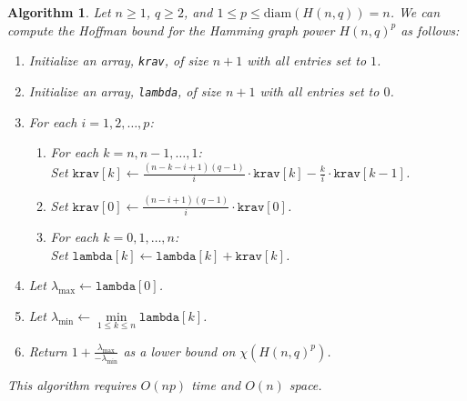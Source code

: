 \documentclass{article}
\numberwithin{equation}{section}
\theoremstyle{plain}
\newtheorem{algo}[theorem]{Algorithm}
\begin{document}
\begin{algo}\label{algo:3.5}
    Let $n \ge 1$, $q \ge 2$, and $1 \le p \le \mathrm{diam}(H(n, q)) = n$. We can compute the Hoffman bound for the Hamming graph power $H(n, q)^p$ as follows:
    {
        \normalfont
        \begin{enumerate}
            \item Initialize an array, \texttt{krav}, of size $n + 1$ with all entries set to $1$.
            \item Initialize an array, \texttt{lambda}, of size $n + 1$ with all entries set to $0$.
            \item For each $i = 1, 2, \ldots, p$:
                \begin{enumerate}
                    \item For each $k = n, n - 1, \ldots, 1$:\\
                        \hspace*{\algorithmicindent}Set $\texttt{krav}[k] \gets \frac{(n - k - i + 1)(q - 1)}{i} \cdot \texttt{krav}[k] - \frac{k}{i} \cdot \texttt{krav}[k - 1]$.
                    \item Set $\texttt{krav}[0] \gets \frac{(n - i + 1)(q - 1)}{i} \cdot \texttt{krav}[0]$.
                    \item For each $k = 0, 1, \ldots, n$:\\
                        \hspace*{\algorithmicindent}Set $\texttt{lambda}[k] \gets \texttt{lambda}[k] + \texttt{krav}[k]$.
                \end{enumerate}
            \item Let $\lambda_{\text{max}} \gets \texttt{lambda}[0]$.
            \item Let $\lambda_{\text{min}} \gets \min\limits_{1 \le k \le n} \texttt{lambda}[k]$.
            \item Return $1 + \frac{\lambda_{\text{max}}}{-\lambda_{\text{min}}}$ as a lower bound on $\chi(H(n, q)^p)$.
        \end{enumerate}
    }
    This algorithm requires $O(np)$ time and $O(n)$ space.
\end{algo}
\end{document}
